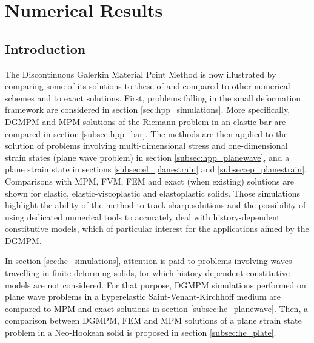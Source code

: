 \chapter{Numerical Results}
\section*{Introduction}
The Discontinuous Galerkin Material Point Method is now illustrated by comparing some of its solutions to these of and compared to other numerical schemes and to exact solutions.
First, problems falling in the small deformation framework are considered in section \ref{sec:hpp_simulations}. More specifically, DGMPM and MPM solutions of the Riemann problem in an elastic bar are compared in section \ref{subsec:hpp_bar}. The methods are then applied to the solution of problems involving multi-dimensional stress and one-dimensional strain states (plane wave problem) in section \ref{subsec:hpp_planewave}, and a plane strain state in sections \ref{subsec:el_planestrain} and \ref{subsec:ep_planestrain}. Comparisons with MPM, FVM, FEM and exact (when existing) solutions are shown for elastic, elastic-viscoplastic and elastoplastic solids.
Those simulations highlight the ability of the method to track sharp solutions and the possibility of using dedicated numerical tools to accurately deal with history-dependent constitutive models, which of particular interest for the applications aimed by the DGMPM. 

In section \ref{sec:he_simulations}, attention is paid to problems involving waves travelling in finite deforming solids, for which history-dependent constitutive models are not considered.
For that purpose, DGMPM simulations performed on plane wave problems in a hyperelastic Saint-Venant-Kirchhoff medium are compared to MPM and exact solutions in section \ref{subsec:he_planewave}. Then, a comparison between DGMPM, FEM and MPM solutions of a plane strain state problem in a Neo-Hookean solid is proposed in section \ref{subsec:he_plate}.

